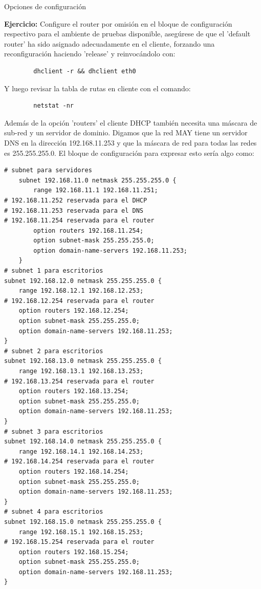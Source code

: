 \begin{frame}{Opciones de configuración}
    \framebreak

    \textbf{Ejercicio:}
    Configure el router por omisión en el bloque de configuración respectivo
    para el ambiente de pruebas disponible, asegúrese de que el 'default
    router' ha sido asignado adecuadamente en el cliente, forzando una
    reconfiguración haciendo 'release' y reinvocándolo con:

    \begin{verbatim}
        dhclient -r && dhclient eth0
    \end{verbatim}

    Y luego revisar la tabla de rutas en cliente con el comando:

    \begin{verbatim}
        netstat -nr
    \end{verbatim}
    
   \framebreak 

    Además de la opción 'routers' el cliente DHCP también necesita una máscara
    de sub-red y un servidor de dominio. Digamos que la red MAY tiene un
    servidor DNS en la dirección 192.168.11.253 y que la máscara de red para
    todas las redes es 255.255.255.0. El bloque de configuración para expresar
    esto sería algo como:\\[0.2cm]
    \begin{verbatim}
# subnet para servidores
    subnet 192.168.11.0 netmask 255.255.255.0 {
        range 192.168.11.1 192.168.11.251;
# 192.168.11.252 reservada para el DHCP 
# 192.168.11.253 reservada para el DNS 
# 192.168.11.254 reservada para el router 
        option routers 192.168.11.254;
        option subnet-mask 255.255.255.0;
        option domain-name-servers 192.168.11.253;
    }
# subnet 1 para escritorios
subnet 192.168.12.0 netmask 255.255.255.0 {
    range 192.168.12.1 192.168.12.253;
# 192.168.12.254 reservada para el router 
    option routers 192.168.12.254;
    option subnet-mask 255.255.255.0;
    option domain-name-servers 192.168.11.253;
}
# subnet 2 para escritorios
subnet 192.168.13.0 netmask 255.255.255.0 {
    range 192.168.13.1 192.168.13.253;
# 192.168.13.254 reservada para el router 
    option routers 192.168.13.254;
    option subnet-mask 255.255.255.0;
    option domain-name-servers 192.168.11.253;
}
# subnet 3 para escritorios
subnet 192.168.14.0 netmask 255.255.255.0 {
    range 192.168.14.1 192.168.14.253;
# 192.168.14.254 reservada para el router 
    option routers 192.168.14.254;
    option subnet-mask 255.255.255.0;
    option domain-name-servers 192.168.11.253;
}
# subnet 4 para escritorios
subnet 192.168.15.0 netmask 255.255.255.0 {
    range 192.168.15.1 192.168.15.253;
# 192.168.15.254 reservada para el router 
    option routers 192.168.15.254;
    option subnet-mask 255.255.255.0;
    option domain-name-servers 192.168.11.253;
}
\end{verbatim}


\end{frame}
